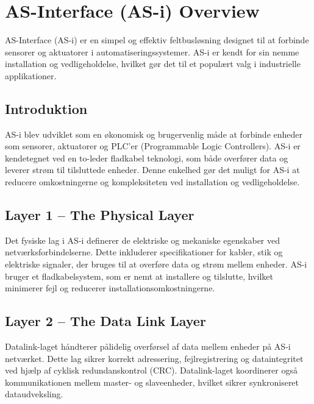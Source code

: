 \section{AS-Interface (AS-i) Overview}
AS-Interface (AS-i) er en simpel og effektiv feltbusløsning designet til at forbinde sensorer og aktuatorer i automatiseringssystemer. AS-i er kendt for sin nemme installation og vedligeholdelse, hvilket gør det til et populært valg i industrielle applikationer.

\subsection{Introduktion}
AS-i blev udviklet som en økonomisk og brugervenlig måde at forbinde enheder som sensorer, aktuatorer og PLC'er (Programmable Logic Controllers). AS-i er kendetegnet ved en to-leder fladkabel teknologi, som både overfører data og leverer strøm til tilsluttede enheder. Denne enkelhed gør det muligt for AS-i at reducere omkostningerne og kompleksiteten ved installation og vedligeholdelse.

\subsection{Layer 1 – The Physical Layer}
Det fysiske lag i AS-i definerer de elektriske og mekaniske egenskaber ved netværksforbindelserne. Dette inkluderer specifikationer for kabler, stik og elektriske signaler, der bruges til at overføre data og strøm mellem enheder. AS-i bruger et fladkabelsystem, som er nemt at installere og tilslutte, hvilket minimerer fejl og reducerer installationsomkostningerne.

\subsection{Layer 2 – The Data Link Layer}
Datalink-laget håndterer pålidelig overførsel af data mellem enheder på AS-i netværket. Dette lag sikrer korrekt adressering, fejlregistrering og dataintegritet ved hjælp af cyklisk redundanskontrol (CRC). Datalink-laget koordinerer også kommunikationen mellem master- og slaveenheder, hvilket sikrer synkroniseret dataudveksling.

